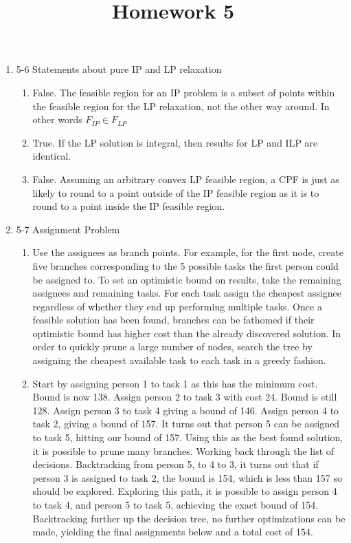 \documentclass[12pt, letter]{article}
\title{ Homework 5 }
\begin{document}
\maketitle
\thispagestyle{fancy}

\begin{enumerate}
	\item 5-6 Statements about pure IP and LP relaxation
	\begin{enumerate}
		\item False. The feasible region for an IP problem is a subset of points within the feasible region for the LP relaxation, not the other way around. In other words $F_{IP} \in F_{LP}$
		\item True. If the LP solution is integral, then results for LP and ILP are identical.
		\item False. Assuming an arbitrary convex LP feasible region, a CPF is just as likely to round to a point outside of the IP feasible region as it is to round to a point inside the IP feasible region.
	\end{enumerate}
	\item 5-7 Assignment Problem
	\begin{enumerate}
		\item Use the assignees as branch points. For example, for the first node, create five branches corresponding to the 5 possible tasks the first person could be assigned to. To set an optimistic bound on results, take the remaining assignees and remaining tasks. For each task assign the cheapest assignee regardless of whether they end up performing multiple tasks. Once a feasible solution has been found, branches can be fathomed if their optimistic bound has higher cost than the already discovered solution. In order to quickly prune a large number of nodes, search the tree by assigning the cheapest available task to each task in a greedy fashion.
		\item Start by assigning person 1 to task 1 as this has the minimum cost. Bound is now 138. Assign person 2 to task 3 with cost 24. Bound is still 128. Assign person 3 to task 4 giving a bound of 146. Assign person 4 to task 2, giving a bound of 157. It turns out that person 5 can be assigned to task 5, hitting our bound of 157. Using this as the best found solution, it is possible to prune many branches. Working back through the list of decisions. Backtracking from person 5, to 4 to 3, it turns out that if person 3 is assigned to task 2, the bound is 154, which is less than 157 so should be explored. Exploring this path, it is possible to assign person 4 to task 4, and person 5 to task 5, achieving the exact bound of 154. Backtracking further up the decision tree, no further optimizations can be made, yielding the final assignments below and a total cost of 154.

\end{enumerate}
\end{enumerate}
\end{document}
